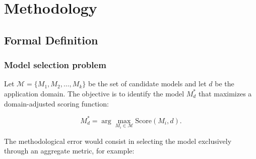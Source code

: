 \documentclass[11pt,a4paper]{article}
\begin{document}





\section{Methodology}

\subsection{Formal Definition}

\subsubsection{Model selection problem}

Let $\mathcal{M}=\{M_1,M_2,\ldots,M_k\}$ be the set of candidate models and let $d$ be the application domain. The objective is to identify the model $M_d^*$ that maximizes a domain-adjusted scoring function:

\begin{equation}
    M_d^* = \arg\max_{M_i \in \mathcal{M}} \mathrm{Score}(M_i,d).
\end{equation}

The methodological error would consist in selecting the model exclusively through an aggregate metric, for example:
\end{document}
